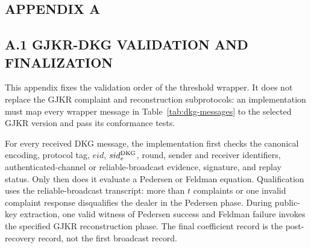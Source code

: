 \documentclass[pdflatex,sn-mathphys-num]{sn-jnl}%
\theoremstyle{thmstyleone}%
\theoremstyle{thmstyletwo}%
\theoremstyle{thmstylethree}%
\begin{document}
\begin{appendices}

\section*{APPENDIX A}

\subsection*{A.1 GJKR-DKG VALIDATION AND FINALIZATION}

This appendix fixes the validation order of the threshold wrapper.  It does not
replace the GJKR complaint and reconstruction subprotocols: an implementation
must map every wrapper message in Table~\ref{tab:dkg-messages} to the selected
GJKR version and pass its conformance tests.

For every received DKG message, the implementation first checks the canonical
encoding, protocol tag, $eid$, $sid_e^{\rm DKG}$, round, sender and receiver
identifiers, authenticated-channel or reliable-broadcast evidence, signature,
and replay status.  Only then does it evaluate a Pedersen or Feldman equation.
Qualification uses the reliable-broadcast transcript: more than $t$ complaints
or one invalid complaint response disqualifies the dealer in the Pedersen
phase.  During public-key extraction, one valid witness of Pedersen success and
Feldman failure invokes the specified GJKR reconstruction phase.  The final
coefficient record is the post-recovery record, not the first broadcast record.


\end{appendices}
\end{document}

